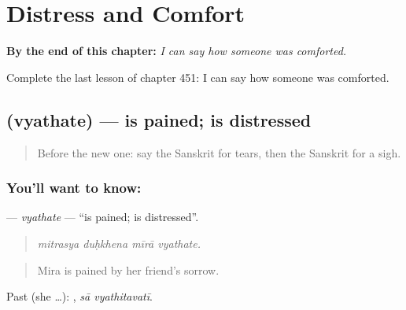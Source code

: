 
\chapter{Distress and Comfort}
\label{ch:sa-distress-and-comfort}

\begin{chapteropening}
\textbf{By the end of this chapter:} \emph{I can say how someone was comforted.}

Complete the last lesson of chapter 451: I can say how someone was comforted.
\end{chapteropening}

\section[\texorpdfstring{\sk{व्यथते} (vyathate)}{व्यथते (vyathate)}]{ (vyathate) — is pained; is distressed}

\label{lesson:SA-C451-vyathate}



\begin{quote}
Before the new one: say the Sanskrit for tears, then the Sanskrit for a sigh.
\end{quote}

\subsection*{You'll want to know: }
\textbf{} — \emph{vyathate} — \textquotedblleft{}is pained; is distressed\textquotedblright{}.

\begin{quote}
   
\end{quote}

\begin{quote}
\emph{mitrasya duḥkhena mīrā vyathate.}
\end{quote}

\begin{quote}
Mira is pained by her friend's sorrow.
\end{quote}

Past (she …):  , \emph{sā vyathitavatī}.

